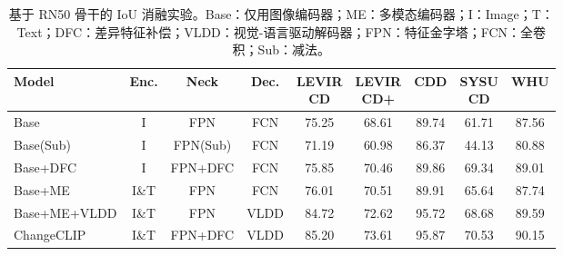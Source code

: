 \begin{table}[!htbp]
\centering
\small
\setlength{\tabcolsep}{2pt} %
\caption{基于 RN50 骨干的 IoU 消融实验。Base：仅用图像编码器；ME：多模态编码器；I：Image；T：Text；DFC：差异特征补偿；VLDD：视觉-语言驱动解码器；FPN：特征金字塔；FCN：全卷积；Sub：减法。}
\label{tab:changeclip_ablation_resnet}
\begin{tabular}{@{}l c c c *{5}{c}@{}}
\toprule
\textbf{Model} & \textbf{Enc.} & \textbf{Neck} & \textbf{Dec.} &
\makecell{\textbf{LEVIR}\\\textbf{CD}} &
\makecell{\textbf{LEVIR}\\\textbf{CD+}} &
\textbf{CDD} &
\makecell{\textbf{SYSU}\\\textbf{CD}} &
\textbf{WHU} \\
\midrule
Base            & I     & FPN       & FCN  & 75.25 & 68.61 & 89.74 & 61.71 & 87.56 \\
Base(Sub)       & I     & FPN(Sub)  & FCN  & 71.19 & 60.98 & 86.37 & 44.13 & 80.88 \\
Base+DFC        & I     & FPN+DFC   & FCN  & 75.85 & 70.46 & 89.86 & 69.34 & 89.01 \\
Base+ME         & I\&T  & FPN       & FCN  & 76.01 & 70.51 & 89.91 & 65.64 & 87.74 \\
Base+ME+VLDD    & I\&T  & FPN       & VLDD & 84.72 & 72.62 & 95.72 & 68.68 & 89.59 \\
ChangeCLIP      & I\&T  & FPN+DFC   & VLDD & 85.20 & 73.61 & 95.87 & 70.53 & 90.15 \\
\bottomrule
\end{tabular}
\end{table}


